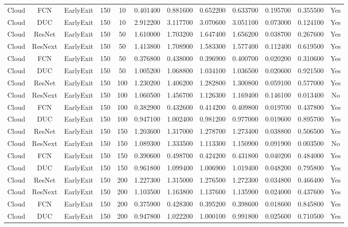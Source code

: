 \begin{tabular}{|c||c||c||c||c||c||c||c||c||c||c||c|}
Cloud & FCN & EarlyExit & 150 & 10 & 0.401400 & 0.881600 & 0.652200 & 0.633700 & 0.195700 & 0.355500 & Yes \\
Cloud & DUC & EarlyExit & 150 & 10 & 2.912200 & 3.117700 & 3.070600 & 3.051100 & 0.073000 & 0.124100 & Yes \\
Cloud & ResNet & EarlyExit & 150 & 50 & 1.610000 & 1.703200 & 1.647400 & 1.656200 & 0.038700 & 0.267600 & Yes \\
Cloud & ResNext & EarlyExit & 150 & 50 & 1.413800 & 1.708900 & 1.583300 & 1.577400 & 0.112400 & 0.619500 & Yes \\
Cloud & FCN & EarlyExit & 150 & 50 & 0.376800 & 0.438000 & 0.396900 & 0.400700 & 0.020200 & 0.310600 & Yes \\
Cloud & DUC & EarlyExit & 150 & 50 & 1.005200 & 1.068800 & 1.034100 & 1.036500 & 0.020600 & 0.921500 & Yes \\
Cloud & ResNet & EarlyExit & 150 & 100 & 1.230200 & 1.406200 & 1.282800 & 1.300800 & 0.059100 & 0.577000 & Yes \\
Cloud & ResNext & EarlyExit & 150 & 100 & 1.060500 & 1.456700 & 1.126300 & 1.169400 & 0.146100 & 0.013400 & No \\
Cloud & FCN & EarlyExit & 150 & 100 & 0.382900 & 0.432600 & 0.414200 & 0.409800 & 0.019700 & 0.437800 & Yes \\
Cloud & DUC & EarlyExit & 150 & 100 & 0.947100 & 1.002400 & 0.981200 & 0.977000 & 0.019600 & 0.895700 & Yes \\
Cloud & ResNet & EarlyExit & 150 & 150 & 1.203600 & 1.317000 & 1.278700 & 1.273400 & 0.038800 & 0.506500 & Yes \\
Cloud & ResNext & EarlyExit & 150 & 150 & 1.089300 & 1.333500 & 1.113300 & 1.150900 & 0.091900 & 0.003500 & No \\
Cloud & FCN & EarlyExit & 150 & 150 & 0.390600 & 0.498700 & 0.424200 & 0.431800 & 0.040200 & 0.484000 & Yes \\
Cloud & DUC & EarlyExit & 150 & 150 & 0.961800 & 1.099400 & 1.006900 & 1.019400 & 0.048200 & 0.795800 & Yes \\
Cloud & ResNet & EarlyExit & 150 & 200 & 1.227300 & 1.315000 & 1.276500 & 1.272300 & 0.034800 & 0.466400 & Yes \\
Cloud & ResNext & EarlyExit & 150 & 200 & 1.103500 & 1.163800 & 1.137600 & 1.135900 & 0.024000 & 0.437600 & Yes \\
Cloud & FCN & EarlyExit & 150 & 200 & 0.375900 & 0.428300 & 0.395200 & 0.398600 & 0.018600 & 0.845800 & Yes \\
Cloud & DUC & EarlyExit & 150 & 200 & 0.947800 & 1.022200 & 1.000100 & 0.991800 & 0.025600 & 0.710500 & Yes \\

\end{tabular}
